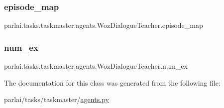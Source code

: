 \subsubsection{\texorpdfstring{episode\+\_\+map}{episode\_map}}
{\footnotesize\ttfamily parlai.\+tasks.\+taskmaster.\+agents.\+Woz\+Dialogue\+Teacher.\+episode\+\_\+map}

\mbox{\label{classparlai_1_1tasks_1_1taskmaster_1_1agents_1_1WozDialogueTeacher_a27b3ee35b98d89914bc5079d8a6e75aa}} 
\subsubsection{\texorpdfstring{num\+\_\+ex}{num\_ex}}
{\footnotesize\ttfamily parlai.\+tasks.\+taskmaster.\+agents.\+Woz\+Dialogue\+Teacher.\+num\+\_\+ex}



The documentation for this class was generated from the following file\+:\begin{DoxyCompactItemize}
\item 
parlai/tasks/taskmaster/\hyperlink{parlai_2tasks_2taskmaster_2agents_8py}{agents.\+py}\end{DoxyCompactItemize}
